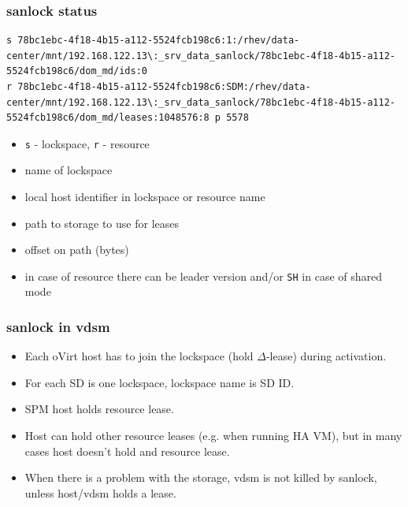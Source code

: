 \documentclass[10pt,utf8]{beamer}
\begin{document}
\begin{frame}[fragile]
    \frametitle{sanlock status}
    \begin{lstlisting}[style=log]
s 78bc1ebc-4f18-4b15-a112-5524fcb198c6:1:/rhev/data-center/mnt/192.168.122.13\:_srv_data_sanlock/78bc1ebc-4f18-4b15-a112-5524fcb198c6/dom_md/ids:0
r 78bc1ebc-4f18-4b15-a112-5524fcb198c6:SDM:/rhev/data-center/mnt/192.168.122.13\:_srv_data_sanlock/78bc1ebc-4f18-4b15-a112-5524fcb198c6/dom_md/leases:1048576:8 p 5578
    \end{lstlisting}
    
    \begin{itemize}
        \item \texttt{s} - lockspace, \texttt{r} - resource
        \item name of lockspace
        \item local host identifier in lockspace or resource name
        \item path to storage to use for leases
        \item offset on path (bytes)
        \item in case of resource there can be leader version and/or \texttt{SH} in case of shared mode
    \end{itemize}
\end{frame}

\begin{frame}
    \frametitle{sanlock in vdsm}
    \begin{itemize}
        \item Each oVirt host has to join the lockspace (hold $\Delta$-lease) during activation.
        \item For each SD is one lockspace, lockspace name is SD ID.
        \item SPM host holds resource lease.
        \item Host can hold other resource leases (e.g. when running HA VM), but in many cases host doesn't hold and resource lease.
        \item When there is a problem with the storage, vdsm is not killed by sanlock, unless host/vdsm holds a lease. %
    \end{itemize}
\end{frame}
\end{document}
